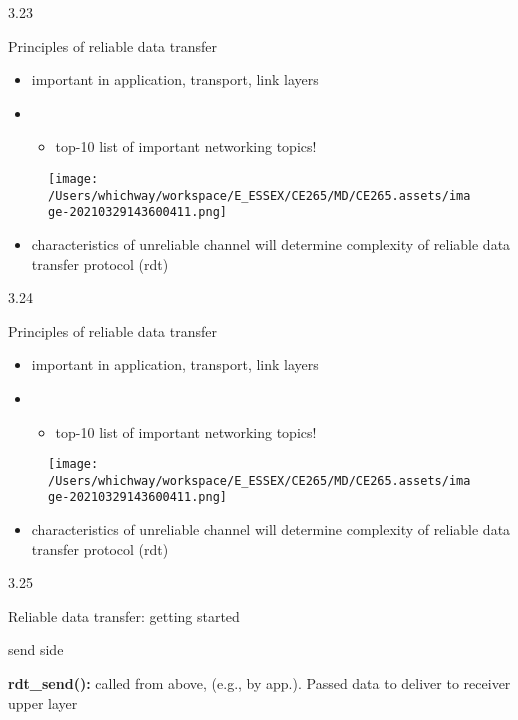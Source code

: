 \documentclass[
]{article}
\begin{document}
3.23

Principles of reliable data transfer

\begin{itemize}
\item
  important in application, transport, link layers
\item
  \begin{itemize}
  \item
    top-10 list of important networking topics!
  \end{itemize}
\end{itemize}

\begin{figure}
\centering
\texttt{[image: /Users/whichway/workspace/E\_ESSEX/CE265/MD/CE265.assets/image-20210329143600411.png]}
\caption{}
\end{figure}

\begin{itemize}
\item
  characteristics of unreliable channel will determine complexity of
  reliable data transfer protocol (rdt)
\end{itemize}

3.24

Principles of reliable data transfer

\begin{itemize}
\item
  important in application, transport, link layers
\item
  \begin{itemize}
  \item
    top-10 list of important networking topics!
  \end{itemize}
\end{itemize}

\begin{figure}
\centering
\texttt{[image: /Users/whichway/workspace/E\_ESSEX/CE265/MD/CE265.assets/image-20210329143600411.png]}
\caption{}
\end{figure}

\begin{itemize}
\item
  characteristics of unreliable channel will determine complexity of
  reliable data transfer protocol (rdt)
\end{itemize}

3.25

Reliable data transfer: getting started

send side

\textbf{rdt\_send():} called from above, (e.g., by app.). Passed data to
deliver to receiver upper layer
\end{document}
